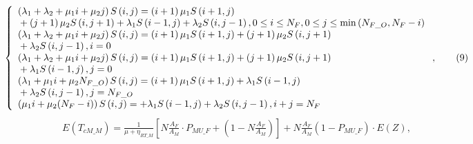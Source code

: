 \documentclass[10pt,final,journal,letterpaper,twoside,twocolumn]{IEEEtran}
\begin{document}
\begin{figure*}[!t]
\[\left\{ \begin{array}{l}\left( {{\lambda _1} + {\lambda _2} + {\mu _1}i + {\mu _2}j} \right)S\left( {i,j} \right) = \left( {i + 1} \right){\mu _1}S\left( {i + 1,j} \right)\\{\rm{                                                                                            }} + \left( {j + 1} \right){\mu _2}S\left( {i,j + 1} \right) + {\lambda _1}S\left( {i - 1,j} \right) + {\lambda _2}S\left( {i,j - 1} \right),{\rm{     }}0 \le i \le {N_F},0 \le j \le \min \left( {{N_{F\_O}},{N_F} - i} \right)\\\left( {{\lambda _1} + {\lambda _2} + {\mu _1}i + {\mu _2}j} \right)S\left( {i,j} \right) = \left( {i + 1} \right){\mu _1}S\left( {i + 1,j} \right) + \left( {j + 1} \right){\mu _2}S\left( {i,j + 1} \right)\\ {\rm{                                          }} + {\lambda _2}S\left( {i,j - 1} \right),{\rm{                                           }}i = 0{\rm{ }}\\\left( {{\lambda _1} + {\lambda _2} + {\mu _1}i + {\mu _2}j} \right)S\left( {i,j} \right) = \left( {i + 1} \right){\mu _1}S\left( {i + 1,j} \right) + \left( {j + 1} \right){\mu _2}S\left( {i,j + 1} \right)\\{\rm{                                          }} + {\lambda _1}S\left( {i - 1,j} \right),{\rm{                                            }}j = 0\\\left( {{\lambda _1} + {\mu _1}i + {\mu _2}{N_{F\_O}}} \right)S\left( {i,j} \right) = \left( {i + 1} \right){\mu _1}S\left( {i + 1,j} \right) + {\lambda _1}S\left( {i - 1,j} \right)\\{\rm{                                          }} + {\lambda _2}S\left( {i,j - 1} \right),{\rm{                                            }}j = {N_{F\_O}}{\rm{            }}\\\left( {{\mu _1}i + {\mu _2}({N_F} - i)} \right)S\left( {i,j} \right) =  + {\lambda _1}S\left( {i - 1,j} \right) + {\lambda _2}S\left( {i,j - 1} \right),{\rm{                      }}i + j = {N_F}\end{array} \right. ,\tag{9}\]
\begin{equation}
\begin{split}
E\left( {T_{cM\_M}} \right) = \frac{1}{{\mu + {\eta _{RT\_M}}}}\left[ {N\frac{{{A_F}}}{{{A_M}}} \cdot {P_{MU\_F}}+\left( {1 - N\frac{{{A_F}}}{{{A_M}}}} \right)} \right]+ N\frac{{{A_F}}}{{{A_M}}}\left( {1 - {P_{MU\_F}}} \right) \cdot E\left( Z \right),

\end{split}
\end{equation}
\end{figure*}
\end{document}
